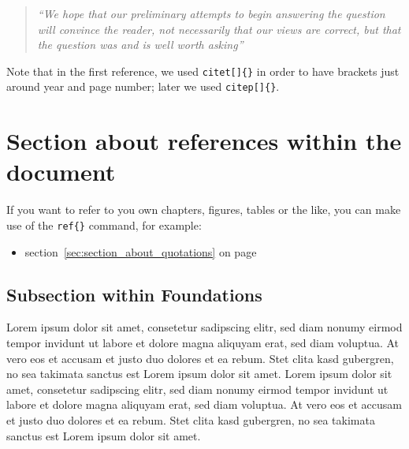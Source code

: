 \documentclass[a4paper]{article}
\begin{document}
\begin{quotation}
	\emph{``We hope that our preliminary attempts to begin answering the question will convince the reader, not necessarily that our views are correct, but that the question was and is well worth asking''}
	\citep[p. 86]{Baddeley:1974ts}
\end{quotation}

Note that in the first reference, we used \texttt{citet[]\{\}} in order to have brackets just around year and page number; later we used \texttt{citep[]\{\}}.



\section{Section about references within the document} %
\label{sec:section_about_references_within_the_document}

If you want to refer to you own chapters, figures, tables or the like, you can make use of the \texttt{ref\{\}} command, for example:
\begin{itemize}
	\item section~\ref{sec:section_about_quotations} on page \pageref{sec:section_about_quotations}
\end{itemize} 




\subsection{Subsection within Foundations} %
\label{sub:subsection_within_foundations}
Lorem ipsum dolor sit amet, consetetur sadipscing elitr, sed diam nonumy eirmod tempor invidunt ut labore et dolore magna aliquyam erat, sed diam voluptua. At vero eos et accusam et justo duo dolores et ea rebum. Stet clita kasd gubergren, no sea takimata sanctus est Lorem ipsum dolor sit amet. Lorem ipsum dolor sit amet, consetetur sadipscing elitr, sed diam nonumy eirmod tempor invidunt ut labore et dolore magna aliquyam erat, sed diam voluptua. At vero eos et accusam et justo duo dolores et ea rebum. Stet clita kasd gubergren, no sea takimata sanctus est Lorem ipsum dolor sit amet.
\end{document}
